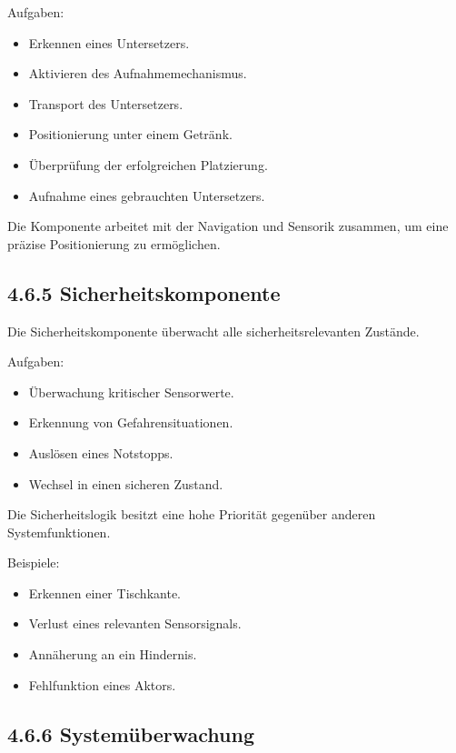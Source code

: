 \documentclass[
  a4paper,
  12pt,
  DIV=12,        %
  parskip=half,  %
  headings=small %
]{scrartcl}
\theoremstyle{definition}
\providecommand{\tightlist}{%
  \setlength{\itemsep}{0pt}\setlength{\parskip}{0pt}}
\theoremstyle{definition}
\providecommand{\tightlist}{%
  \setlength{\itemsep}{0pt}\setlength{\parskip}{0pt}}
\begin{document}
Aufgaben:

\begin{itemize}
\tightlist
\item
  Erkennen eines Untersetzers.
\item
  Aktivieren des Aufnahmemechanismus.
\item
  Transport des Untersetzers.
\item
  Positionierung unter einem Getränk.
\item
  Überprüfung der erfolgreichen Platzierung.
\item
  Aufnahme eines gebrauchten Untersetzers.
\end{itemize}

Die Komponente arbeitet mit der Navigation und Sensorik zusammen, um
eine präzise Positionierung zu ermöglichen.

\subsection{4.6.5 Sicherheitskomponente}\label{sicherheitskomponente-1}

Die Sicherheitskomponente überwacht alle sicherheitsrelevanten Zustände.

Aufgaben:

\begin{itemize}
\tightlist
\item
  Überwachung kritischer Sensorwerte.
\item
  Erkennung von Gefahrensituationen.
\item
  Auslösen eines Notstopps.
\item
  Wechsel in einen sicheren Zustand.
\end{itemize}

Die Sicherheitslogik besitzt eine hohe Priorität gegenüber anderen
Systemfunktionen.

Beispiele:

\begin{itemize}
\tightlist
\item
  Erkennen einer Tischkante.
\item
  Verlust eines relevanten Sensorsignals.
\item
  Annäherung an ein Hindernis.
\item
  Fehlfunktion eines Aktors.
\end{itemize}

\subsection{4.6.6 Systemüberwachung}\label{systemuxfcberwachung-1}
\end{document}
